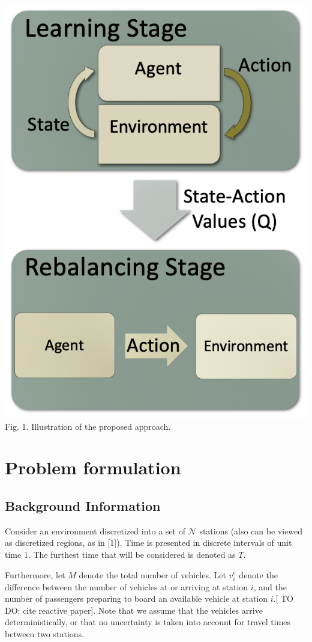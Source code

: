 \documentclass[letterpaper, 10 pt, conference]{ieeeconf}  %
\begin{document}
\includegraphics[scale=0.8]{procedure.png}
Fig. 1. Illustration of the proposed approach.


\section{Problem formulation}
\subsection{Background Information}
Consider an environment discretized into a set of $\mathcal{N}$ stations (also can be viewed as discretized regions, as in [1]). Time is presented in discrete intervals of unit time $1$. The furthest time that will be considered is denoted as $T$.

Furthermore, let $M$ denote the total number of vehicles. Let $v^e_i$ denote the difference between the number of vehicles at or arriving at station $i$, and the number of passengers preparing to board an available vehicle at station $i$.[ TO DO: cite reactive paper]. Note that we assume that the vehicles arrive deterministically, or that no uncertainty is taken into account for travel times between two stations. 
\end{document}
